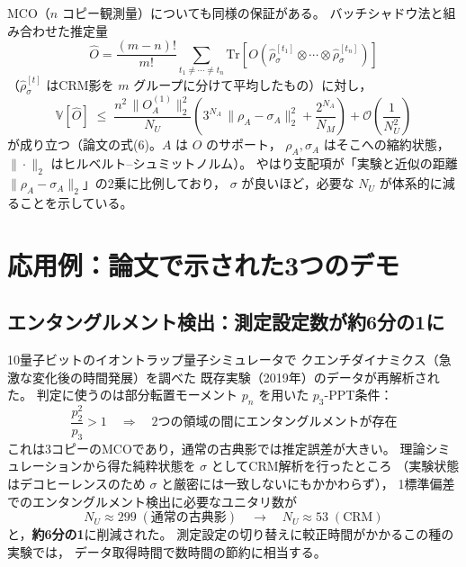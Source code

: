 \documentclass[11pt]{ltjsarticle}
\newcommand{\Tr}{\mathrm{Tr}}
\newcommand{\Var}{\mathbb{V}}
\newcommand{\NU}{N_U}
\newcommand{\NM}{N_M}
\begin{document}
MCO（$n$ コピー観測量）についても同様の保証がある。
バッチシャドウ法\cite{Rath2021}と組み合わせた推定量
\begin{equation}
  \hat O = \frac{(m-n)!}{m!}
  \sum_{t_1 \neq \cdots \neq t_n}
  \Tr\!\left[ O\left( \hat\rho^{[t_1]}_\sigma \otimes \cdots \otimes \hat\rho^{[t_n]}_\sigma \right)\right]
\end{equation}
（$\hat\rho^{[t]}_\sigma$ はCRM影を $m$ グループに分けて平均したもの）に対し，
\begin{equation}
  \Var[\hat O] \;\leq\;
  \frac{n^2\,\|O^{(1)}_A\|_2^2}{\NU}
  \left( 3^{N_A}\,\|\rho_A - \sigma_A\|_2^2 + \frac{2^{N_A}}{\NM} \right)
  + \mathcal{O}\!\left(\frac{1}{\NU^2}\right)
  \label{eq:var-mco}
\end{equation}
が成り立つ（論文の式(6)。$A$ は $O$ のサポート，
$\rho_A, \sigma_A$ はそこへの縮約状態，$\|\cdot\|_2$ はヒルベルト–シュミットノルム）。
やはり支配項が「実験と近似の距離 $\|\rho_A - \sigma_A\|_2$」の2乗に比例しており，
$\sigma$ が良いほど，必要な $\NU$ が体系的に減ることを示している。

\section{応用例：論文で示された3つのデモ}

\subsection{エンタングルメント検出：測定設定数が約6分の1に}

10量子ビットのイオントラップ量子シミュレータで
クエンチダイナミクス（急激な変化後の時間発展）を調べた
既存実験（2019年）のデータが再解析された。
判定に使うのは部分転置モーメント $p_n$ を用いた
$p_3$-PPT条件：
\begin{equation}
  \frac{p_2^2}{p_3} > 1
  \quad\Longrightarrow\quad
  \text{2つの領域の間にエンタングルメントが存在}
\end{equation}
これは3コピーのMCOであり，通常の古典影では推定誤差が大きい。
理論シミュレーションから得た純粋状態を $\sigma$ としてCRM解析を行ったところ
（実験状態はデコヒーレンスのため $\sigma$ と厳密には一致しないにもかかわらず），
1標準偏差でのエンタングルメント検出に必要なユニタリ数が
\begin{equation}
  \NU \approx 299 \;(\text{通常の古典影})
  \quad\longrightarrow\quad
  \NU \approx 53 \;(\text{CRM})
\end{equation}
と，\textbf{約6分の1}に削減された。
測定設定の切り替えに較正時間がかかるこの種の実験では，
データ取得時間で数時間の節約に相当する。
\end{document}
